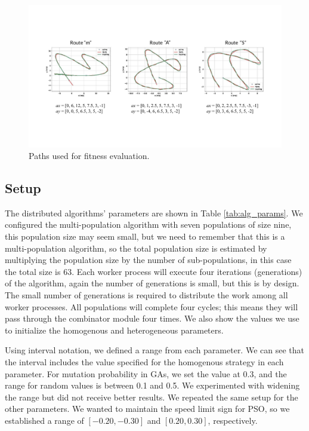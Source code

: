\documentclass[runningheads]{llncs}
\begin{document}
\begin{figure}
  \centering
  \includegraphics[angle=0,width=1\textwidth]{Routes}
  \caption{Paths used for fitness evaluation.}
  \label{fig:Routes} 
\end{figure}

\subsection{Setup}\label{sub:conf}

The distributed algorithms' parameters are shown in Table \ref{tab:alg_params}.
We configured the multi-population algorithm with seven populations of size
nine, this population size may seem small, but we need to remember that this is
a multi-population algorithm, so the total population size is estimated by
multiplying the population size by the number of sub-populations, in this case
the total size is 63. Each worker process will execute four iterations
(generations) of the algorithm, again the number of generations is small, but
this is by design. The small number of generations is required to distribute
the work among all worker processes. All populations will complete four cycles;
this means they will pass through the combinator module four times. We also
show the values we use to initialize the homogenous and heterogeneous
parameters.

Using interval notation, we defined a range from each parameter. We
can see that the interval includes the value specified for the homogenous
strategy in each parameter. For mutation probability in GAs, we set the value
at 0.3, and the range for random values is between 0.1 and 0.5. We experimented
with widening the range but did not receive better results. We repeated the
same setup for the other parameters. We wanted to maintain the speed limit sign
for PSO, so we established a range of $[-0.20, -0.30]$ and $[0.20, 0.30]$,
respectively. 
\end{document}
